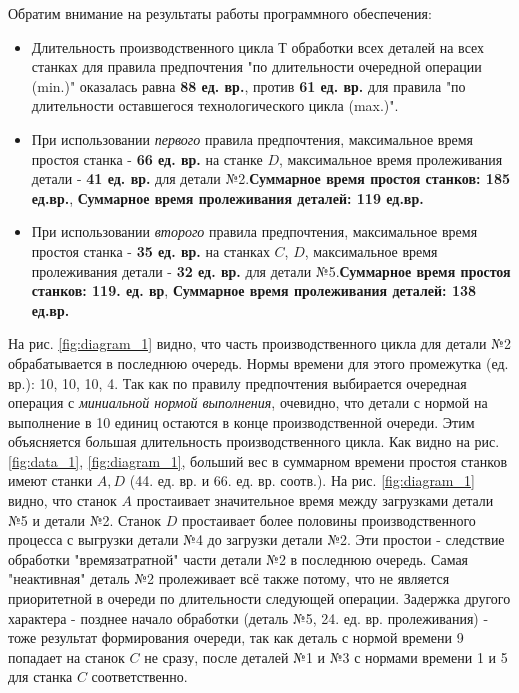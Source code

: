 \documentclass[a4paper,12pt]{article}
\begin{document}
\begin{flushleft}
\begin{enumerate}
\begin{figure}[H]
    \centering
    \caption{}
    \label{fig:diagram_2}
  \end{figure}
  Обратим внимание на результаты работы программного обеспечения:
  \begin{itemize}
    \item Длительность производственного цикла Т обработки всех деталей на всех станках для правила предпочтения "по длительности очередной операции (min.)" оказалась равна \textbf{88 ед. вр.}, против \textbf{61 ед. вр.} для правила "по длительности оставшегося технологического цикла (max.)".
    \item При использовании \textit{первого} правила предпочтения, максимальное время простоя станка - \textbf{66 ед. вр.} на станке $D$, максимальное время пролеживания детали - \textbf{41 ед. вр.} для детали №2.\newline\textbf{Суммарное время простоя станков: 185 ед.вр.}, \textbf{Суммарное время пролеживания деталей: 119 ед.вр.}
    \item При использовании \textit{второго} правила предпочтения, максимальное время простоя станка - \textbf{35 ед. вр.} на станках $C$, $D$, максимальное время пролеживания детали - \textbf{32 ед. вр.} для детали №5.\newline\textbf{Суммарное время простоя станков: 119. ед. вр}, \textbf{Суммарное время пролеживания деталей: 138 ед.вр.}
  \end{itemize}
  На рис. \ref{fig:diagram_1} видно, что часть производственного цикла для детали №2 обрабатывается в последнюю очередь. Нормы времени для этого промежутка (ед. вр.): 10, 10, 10, 4. Так как по правилу предпочтения выбирается очередная операция с \textit{миниальной нормой выполнения}, очевидно, что детали с нормой на выполнение в 10 единиц остаются в конце производственной очереди. Этим объясняется б\emph{о}льшая длительность производственного цикла.\newline\linebreak
  Как видно на рис. \ref{fig:data_1}, \ref{fig:diagram_1}, б\emph{о}льший вес в суммарном времени простоя станков имеют станки $A, D$ (44. ед. вр. и 66. ед. вр. соотв.). На рис. \ref{fig:diagram_1} видно, что станок $A$ простаивает значительное время между загрузками детали №5 и детали №2. Станок $D$ простаивает более половины производственного процесса с выгрузки детали №4 до загрузки детали №2. Эти простои - следствие обработки "времязатратной" части детали №2 в последнюю очередь.
  \newline\linebreak
  Самая "неактивная" деталь №2 пролеживает всё также потому, что не является приоритетной в очереди по длительности следующей операции. Задержка другого характера - позднее начало обработки (деталь №5, 24. ед. вр. пролеживания) - тоже результат формирования очереди, так как деталь с нормой времени 9 попадает на станок $C$ не сразу, после деталей №1 и №3 с нормами времени 1 и 5 для станка $C$ соответственно.

\end{enumerate}
\end{flushleft}
\end{document}
